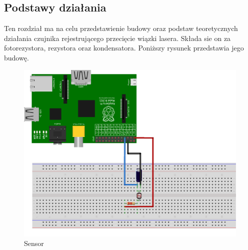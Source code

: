\documentclass[11pt,a4paper, twoside]{article}
\begin{document}
\subsection{Podstawy działania}
Ten rozdział ma na celu przedstawienie budowy oraz podstaw teoretycznych działania czujnika rejestrującego przecięcie wiązki lasera. Składa sie on za fotorezystora, rezystora oraz kondensatora. Poniższy rysunek przedstawia jego budowę.
\newline
\begin{figure}[h]
\includegraphics[scale=0.15]{./img/sensor_bb.png}
\caption{Sensor}
\end{figure}
\newpage
\end{document}
